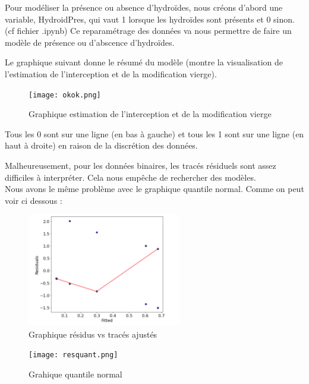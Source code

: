 \documentclass{article}
\theoremstyle{definition}
\begin{document}
Pour modéliser la présence ou absence d'hydroïdes, nous créons d'abord une variable, HydroidPres, qui vaut 1 lorsque les hydroïdes sont présents et 0 sinon. (cf fichier .ipynb)
Ce reparamétrage des données va nous permettre de faire un modèle de présence ou d'abscence d'hydroïdes.

\vspace{2cm}

Le graphique suivant donne le résumé du modèle (montre la visualisation de l'estimation de l'interception et de la modification vierge).

\begin{figure}[!h]
\texttt{[image: okok.png]}
\caption{Graphique estimation de l'interception et de la modification vierge}
\label{exemple somme}
\end{figure}

\vspace{2cm}

Tous les 0 sont sur une ligne (en bas à gauche) et tous les 1 sont sur une ligne (en haut à droite) en raison de la discrétion des données.\\

\newpage

Malheureusement, pour les données binaires, les tracés résiduels sont assez difficiles à interpréter. 
Cela nous empêche de rechercher des modèles. \\
Nous avons le même problème avec le graphique quantile normal.
Comme on peut voir ci dessous :


\begin{center}
\begin{figure}[!h]
\centerline{\includegraphics[width=0.6\textwidth]{bonresfit.png}}
\caption{Graphique résidus vs tracés ajustés}
\label{exemple somme}
\end{figure}


\begin{figure}[!h]
\centerline{\texttt{[image: resquant.png]}}
\caption{Grahique quantile normal}
\label{exemple somme}
\end{figure}
\end{center}
\end{document}
